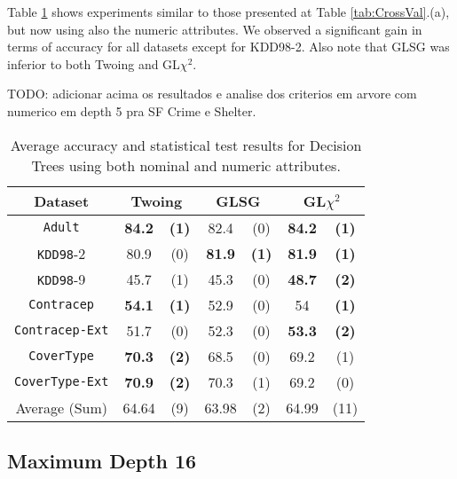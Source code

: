 Table \ref{exp:secondsetnumeric} shows experiments  similar to those presented at Table \ref{tab:CrossVal}.(a), but now
using also the numeric attributes. We observed a significant gain in terms of accuracy for all datasets except for KDD98-2. 
Also note that GLSG was inferior to both Twoing and GL$\chi^2$.

TODO: adicionar acima os resultados e analise dos criterios em arvore com numerico em depth 5 pra SF Crime e Shelter.

\begin{table}
\small
\caption{Average accuracy and statistical test results for  Decision Trees using both nominal and numeric attributes.}
\centering
\begin{tabular}{c|cc|cc|cc} 
Dataset &        \multicolumn{2}{c|}{Twoing} &   \multicolumn{2}{c|}{GLSG} &   \multicolumn{2}{c}{GL$\chi^2$} \\  \hline   
{\tt Adult}      &   {\bf 84.2 }  & {\bf (1) }    & 82.4  & (0)   &  {\bf 84.2} & {\bf (1) }        \\
{\tt KDD98}-2      & 80.9   & (0)      & {\bf 81.9 }& {\bf (1)}   & {\bf 81.9}  & {\bf (1)}        \\ 
{\tt KDD98}-9      & 45.7 &   (1)    & 45.3 &  (0)  & {\bf 48.7 }  &{\bf  (2)  }        \\ 
{\tt Contracep}  &{\bf  54.1  }&{\bf   (1)}      & 52.9   &  (0)  & 54    &{\bf  (1) }     \\ 
{\tt Contracep-Ext}  & 51.7  &  (0)      & 52.3   &  (0) & {\bf 53.3 }   & {\bf (2) }    \\ 
{\tt CoverType}  &  {\bf 70.3 } &  {\bf  (2) }   &   68.5  &  (0)   &   69.2   &  (1)      \\ 
{\tt CoverType-Ext}  & {\bf 70.9}   & {\bf (2) }     &  70.3    &  (1)  &  69.2     & (0)      \\  \hline
Average (Sum)  & 64.64  &  (9)  & 63.98  &  (2)   &   64.99   &  (11)

\end{tabular}
\label{exp:secondsetnumeric}
\normalsize
\end{table}


\subsection{Maximum Depth 16}


